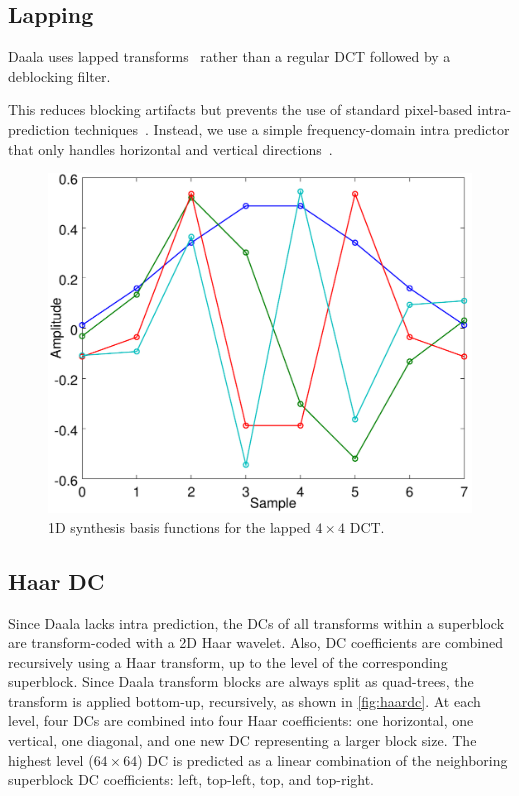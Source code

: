 \documentclass[english,conference,10pt]{IEEEtran}
\begin{document}
\subsection{Lapping}

Daala uses lapped transforms~\cite{MalvarS89,Tran2003} rather than
a regular DCT followed by a deblocking filter. 

This reduces blocking artifacts but prevents the use of standard pixel-based
intra-prediction techniques~\cite{DaedeDCC}. Instead, we use a simple
frequency-domain intra predictor that only handles horizontal and
vertical directions~\cite{EggePCS}. 

\begin{figure}
	\centering
	\includegraphics[width=0.8\columnwidth]{basis4}
	\caption{1D synthesis basis functions for the lapped $4 \times 4$ DCT.}
	\label{fig: basis4}
\end{figure}

\subsection{Haar DC}

Since Daala lacks intra prediction, the DCs of all transforms within a superblock
are transform-coded with a 2D Haar wavelet.
Also, DC coefficients are combined recursively using a Haar transform,
up to the level of the corresponding superblock. Since Daala transform blocks
are always split as quad-trees, the transform is applied bottom-up, recursively,
as shown in \cref{fig:haardc}.
At each level, four DCs are combined into four Haar coefficients: one horizontal,
one vertical, one diagonal, and one new DC representing a larger block size.
The highest level ($64\times 64$) DC is predicted as a linear combination of the 
neighboring superblock DC coefficients: left, top-left, top, and top-right.
\end{document}
